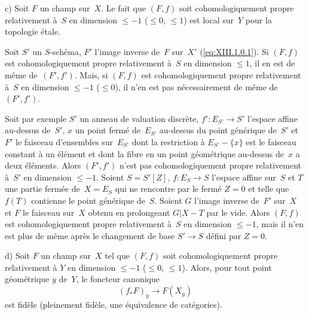 \begin{remarques}
c) Soit $F$ un champ sur~$X$. Le fait que $(F,f)$ soit
cohomologiquement propre relativement \`a~$S$ en dimension
$\leqslant -1$ (\resp $\leqslant 0$, \resp $\leqslant 1$) est local
sur~$Y$ pour la topologie \'etale.

Soit $S'$ un $S$-sch\'ema, $F'$ l'image inverse de~$F$ sur~$X'$
(\cf \eqref{eq:XIII.1.0.1}). Si $(F,f)$ est cohomologiquement propre
relativement \`a~$S$ en dimension $\leqslant 1$, il en est de
m\^eme de~$(F', f')$. Mais, si $(F,f)$ est cohomologiquement propre
relativement \`a~$S$ en dimension $\leqslant -1$ (\resp $\leqslant
0$), il n'en est pas n\'ecessairement de m\^eme de~$(F', f')$.

Soit par exemple $S'$ un anneau de valuation discr\`ete, $f' \colon
E_{S'} \to S'$ l'espace affine au-dessus de~$S'$, $x$ un point
ferm\'e de~$E_{S'}$ au-dessus du point g\'en\'erique de~$S'$ et
$F'$ le faisceau d'ensembles sur~$E_{S'}$ dont la restriction \`a
$E_{S'}-\{x\}$ est le faisceau constant \`a un \'el\'ement et
dont la fibre en un point g\'eom\'etrique au-dessus de~$x$ a deux
\'el\'ements. Alors $(F',f')$ n'est pas cohomologiquement propre
relativement \`a~$S'$ en dimension $\leqslant -1$. Soient $S =
S'[Z]$, $f \colon E_S \to S$ l'espace affine sur~$S$ et $T$ une partie
ferm\'ee de~$X = E_S$ qui ne rencontre par le ferm\'e $Z=0$ et
telle que $f(T)$ contienne le point g\'en\'erique de~$S$. Soient
$G$ l'image inverse de~$F'$ sur~$X$ et $F$ le faisceau sur~$X$ obtenu
en prolongeant $G|X-T$ par le vide. Alors $(F,f)$ est
cohomologiquement propre relativement \`a~$S$ en dimension
$\leqslant -1$, mais il n'en est plus de m\^eme apr\`es le
changement de base $S' \to S$ d\'efini par $Z=0$.


d)
Soit $F$ un champ sur~$X$ tel que $(F,f)$ soit cohomologiquement
propre relativement \`a $Y$ en dimension $\leqslant -1$ (\resp $\leqslant 0$, \resp $\leqslant 1$). Alors, pour tout point
g\'eom\'etrique $\overline{y}$ de~$Y$, le foncteur canonique
$$
(f_* F)_{\overline{y}} \to F(X_{\overline{y}})
$$
est fid\`ele (\resp pleinement fid\`ele, \resp une \'equivalence
de cat\'egories).
\end{remarques}

